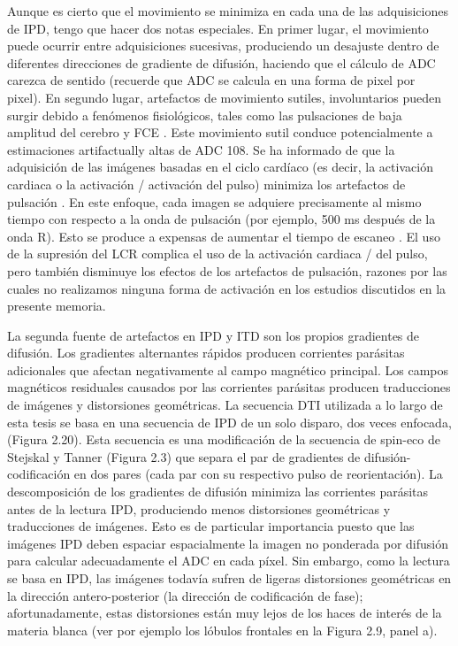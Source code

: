 \documentclass[12pt,a5,twoside]{book}
\begin{document}
Aunque es cierto que el movimiento se minimiza en cada una de las adquisiciones de IPD, tengo que hacer dos notas especiales. En primer lugar, el movimiento puede ocurrir entre adquisiciones sucesivas, produciendo un desajuste dentro de diferentes direcciones de gradiente de difusión, haciendo que el cálculo de ADC carezca de sentido (recuerde que ADC se calcula en una forma de pixel por pixel). En segundo lugar, artefactos de movimiento sutiles, involuntarios pueden surgir debido a fenómenos fisiológicos, tales como las pulsaciones de baja amplitud del cerebro y FCE \citep{107}. Este movimiento sutil conduce potencialmente a estimaciones artifactually altas de ADC 108. Se ha informado de que la adquisición de las imágenes basadas en el ciclo cardíaco (es decir, la activación cardiaca o la activación / activación del pulso) minimiza los artefactos de pulsación \citep{108,109}. En este enfoque, cada imagen se adquiere precisamente al mismo tiempo con respecto a la onda de pulsación (por ejemplo, 500 ms después de la onda R). Esto se produce a expensas de aumentar el tiempo de escaneo \citep{108}. El uso de la supresión del LCR \citep{Concha_2005} complica el uso de la activación cardiaca / del pulso, pero también disminuye los efectos de los artefactos de pulsación, razones por las cuales no realizamos ninguna forma de activación en los estudios discutidos en la presente memoria.

La segunda fuente de artefactos en IPD y ITD son los propios gradientes de difusión. Los gradientes alternantes rápidos producen corrientes parásitas adicionales que afectan negativamente al campo magnético principal. Los campos magnéticos residuales causados por las corrientes parásitas producen traducciones de imágenes y distorsiones geométricas. La secuencia DTI utilizada a lo largo de esta tesis se basa en una secuencia de IPD de un solo disparo, dos veces enfocada, \citep{110} (Figura 2.20). Esta secuencia es una modificación de la secuencia de spin-eco de Stejskal y Tanner (Figura 2.3) que separa el par de gradientes de difusión-codificación en dos pares (cada par con su respectivo pulso de reorientación). La descomposición de los gradientes de difusión minimiza las corrientes parásitas antes de la lectura IPD, produciendo menos distorsiones geométricas y traducciones de imágenes. Esto es de particular importancia puesto que las imágenes IPD deben espaciar espacialmente la imagen no ponderada por difusión para calcular adecuadamente el ADC en cada píxel. Sin embargo, como la lectura se basa en IPD, las imágenes todavía sufren de ligeras distorsiones geométricas en la dirección antero-posterior (la dirección de codificación de fase); afortunadamente, estas distorsiones están muy lejos de los haces de interés de la materia blanca (ver por ejemplo los lóbulos frontales en la Figura 2.9, panel a).
\end{document}
